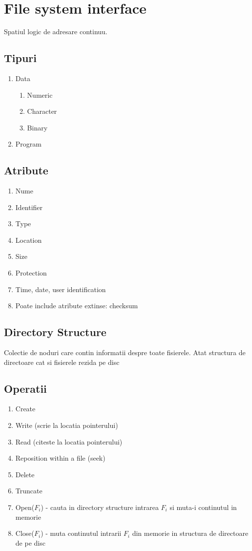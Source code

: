 \documentclass{article}
\begin{document}
\section[Ch13 File system interface]{File system interface}
Spatiul logic de adresare continuu.
\subsection*{Tipuri}
\begin{enumerate}
    \item Data
    \begin{enumerate}
        \item Numeric
        \item Character
        \item Binary
    \end{enumerate}
    \item Program
\end{enumerate}

\subsection*{Atribute}
\begin{enumerate}
    \item Nume
    \item Identifier
    \item Type
    \item Location
    \item Size
    \item Protection
    \item Time, date, user identification
    \item Poate include atribute extinse: checksum
\end{enumerate}

\subsection*{Directory Structure}
Colectie de noduri care contin informatii despre toate fisierele. Atat structura de directoare cat si fisierele rezida pe disc

\subsection*{Operatii}
\begin{enumerate}
    \item Create
    \item Write (scrie la locatia pointerului)
    \item Read (citeste la locatia pointerului)
    \item Reposition within a file (seek)
    \item Delete
    \item Truncate
    \item Open($F_i$) - cauta in directory structure intrarea $F_i$ si muta-i continutul in memorie
    \item Close($F_i$) - muta continutul intrarii $F_i$ din memorie in structura de directoare de pe disc
\end{enumerate}
\end{document}
